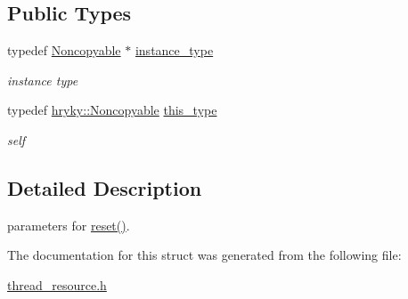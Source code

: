 \subsection*{Public Types}
\begin{DoxyCompactItemize}
\item 
\hypertarget{classhryky_1_1_noncopyable_aaf87abb55f700af85ecb0895f6178821}{typedef \hyperlink{classhryky_1_1_noncopyable}{Noncopyable} $\ast$ \hyperlink{classhryky_1_1_noncopyable_aaf87abb55f700af85ecb0895f6178821}{instance\-\_\-type}}\label{classhryky_1_1_noncopyable_aaf87abb55f700af85ecb0895f6178821}

\begin{DoxyCompactList}\small\item\em instance type \end{DoxyCompactList}\item 
\hypertarget{classhryky_1_1_noncopyable_acf13ad1c98a76247a561dff514979da5}{typedef \hyperlink{classhryky_1_1_noncopyable}{hryky\-::\-Noncopyable} \hyperlink{classhryky_1_1_noncopyable_acf13ad1c98a76247a561dff514979da5}{this\-\_\-type}}\label{classhryky_1_1_noncopyable_acf13ad1c98a76247a561dff514979da5}

\begin{DoxyCompactList}\small\item\em self \end{DoxyCompactList}\end{DoxyCompactItemize}


\subsection{Detailed Description}
parameters for \hyperlink{classhryky_1_1thread_1_1_resource_a1456f170e50e126104346013f1436b51}{reset()}. 

The documentation for this struct was generated from the following file\-:\begin{DoxyCompactItemize}
\item 
\hyperlink{thread__resource_8h}{thread\-\_\-resource.\-h}\end{DoxyCompactItemize}

